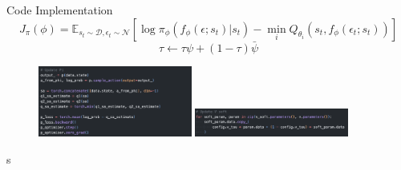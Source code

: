 \documentclass[8pt]{beamer}
\begin{document}
\begin{frame}{Code Implementation}
    \begin{equation*}
        J_\pi (\phi) = \mathbb{E}_{s_t \sim \mathcal{D}, \epsilon_t \sim \mathcal{N}} [\log{\pi_\phi (f_\phi (\epsilon; s_t)| s_t)} - \min_i Q_{\theta_i} (s_t, f_\phi(\epsilon_t ; s_t)) ]
    \end{equation*}
    \[
        \tau \leftarrow \tau \psi + (1- \tau)\bar{\psi}
     \]
    \begin{figure}
        \centering
        \includegraphics[width=0.45\textwidth]{fig6.png}
        \includegraphics[width=0.45\textwidth]{fig7.png}
    \end{figure}
\end{frame}s
\end{document}
